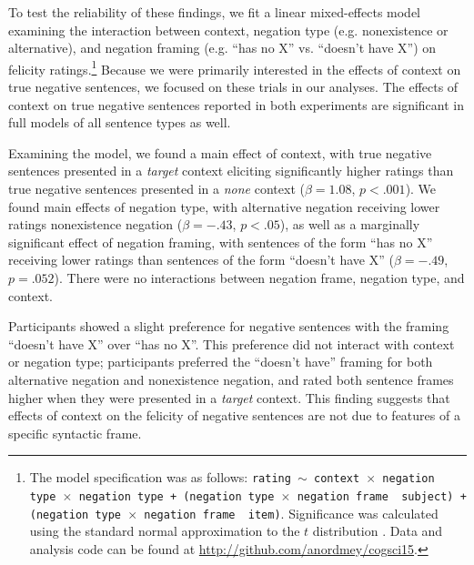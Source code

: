 \documentclass[10pt,letterpaper]{article}
\begin{document}
To test the reliability of these findings, we fit a linear mixed-effects model examining the interaction between context, negation type (e.g. nonexistence or alternative), and negation framing (e.g. ``has no X'' vs. ``doesn't have X'') on felicity ratings.\footnote{ The model specification was as follows: \texttt{rating $\sim$ context~$\times$~negation type~$\times$~negation type + (negation type~$\times$~negation frame~\textbar~subject) +  (negation type~$\times$~negation frame~\textbar~item)}.  Significance was calculated using the standard normal approximation to the $t$ distribution \cite{barr2013}. Data and analysis code can be found at \href{http://github.com/anordmey/cogsci15}{http://github.com/anordmey/cogsci15}.} Because we were primarily interested in the effects of context on true negative sentences, we focused on these trials in our analyses.  The effects of context on true negative sentences reported in both experiments are significant in full models of all sentence types as well.

Examining the model, we found a main effect of context, with true negative sentences presented in a \emph{target} context eliciting significantly higher ratings than true negative sentences presented in a \emph{none} context ($\beta= 1.08$, $p< .001$).  We found main effects of negation type, with alternative negation receiving lower ratings nonexistence negation ($\beta= -.43$, $p< .05$), as well as a marginally significant effect of negation framing, with sentences of the form ``has no X'' receiving lower ratings than sentences of the form ``doesn't have X''  ($\beta= -.49$, $p= .052$).  There were no interactions between negation frame, negation type, and context.  

Participants showed a slight preference for negative sentences with the framing ``doesn't have X'' over ``has no X''.  This preference did not interact with context or negation type; participants preferred the ``doesn't have'' framing for both alternative negation and nonexistence negation, and rated both sentence frames higher when they were presented in a \emph{target} context.  This finding suggests that effects of context on the felicity of negative sentences are not due to features of a specific syntactic frame.
\end{document}
